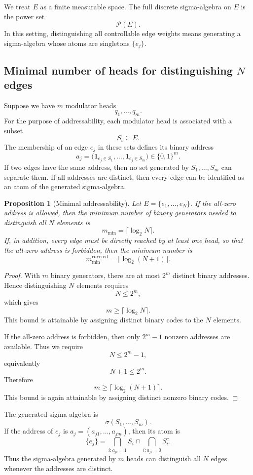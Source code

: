 \documentclass[11pt]{article}
\newtheorem{proposition}{Proposition}
\newcommand{\1}{\mathbf{1}}
\begin{document}
We treat \(E\) as a finite measurable space. The full discrete sigma-algebra on \(E\) is the power set
\[
\mathcal P(E).
\]
In this setting, distinguishing all controllable edge weights means generating a sigma-algebra whose atoms are singletons \(\{e_j\}\).

\subsection{Minimal number of heads for distinguishing \texorpdfstring{$N$}{N} edges}

Suppose we have \(m\) modulator heads
\[
q_1,\dots,q_m.
\]
For the purpose of addressability, each modulator head is associated with a subset
\[
S_i\subseteq E.
\]
The membership of an edge \(e_j\) in these sets defines its binary address
\[
a_j
=
\big(
\1_{e_j\in S_1},
\dots,
\1_{e_j\in S_m}
\big)
\in \{0,1\}^m.
\]
If two edges have the same address, then no set generated by \(S_1,\dots,S_m\) can separate them. If all addresses are distinct, then every edge can be identified as an atom of the generated sigma-algebra.

\begin{proposition}[Minimal addressability]
Let \(E=\{e_1,\dots,e_N\}\). If the all-zero address is allowed, then the minimum number of binary generators needed to distinguish all \(N\) elements is
\[
m_{\min}=\lceil \log_2 N\rceil.
\]
If, in addition, every edge must be directly reached by at least one head, so that the all-zero address is forbidden, then the minimum number is
\[
m_{\min}^{\mathrm{covered}}
=
\lceil \log_2(N+1)\rceil.
\]
\end{proposition}

\begin{proof}
With \(m\) binary generators, there are at most \(2^m\) distinct binary addresses. Hence distinguishing \(N\) elements requires
\[
N\leq 2^m,
\]
which gives
\[
m\geq \lceil \log_2 N\rceil.
\]
This bound is attainable by assigning distinct binary codes to the \(N\) elements.

If the all-zero address is forbidden, then only \(2^m-1\) nonzero addresses are available. Thus we require
\[
N\leq 2^m-1,
\]
equivalently
\[
N+1\leq 2^m.
\]
Therefore
\[
m\geq \lceil \log_2(N+1)\rceil.
\]
This bound is again attainable by assigning distinct nonzero binary codes.
\end{proof}

The generated sigma-algebra is
\[
\sigma(S_1,\dots,S_m).
\]
If the address of \(e_j\) is \(a_j=(a_{j1},\dots,a_{jm})\), then its atom is
\[
\{e_j\}
=
\bigcap_{i:a_{ji}=1}S_i
\cap
\bigcap_{i:a_{ji}=0}S_i^c.
\]
Thus the sigma-algebra generated by \(m\) heads can distinguish all \(N\) edges whenever the addresses are distinct.
\end{document}
